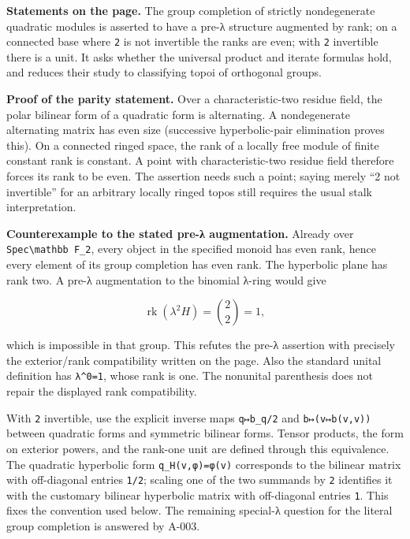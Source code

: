 \documentclass[
  10pt,
]{article}
\begin{document}
\textbf{Statements on the page.} The group completion of strictly
nondegenerate quadratic modules is asserted to have a pre-λ structure
augmented by rank; on a connected base where \texttt{\small 2} is not
invertible the ranks are even; with \texttt{\small 2} invertible there
is a unit. It asks whether the universal product and iterate formulas
hold, and reduces their study to classifying topoi of orthogonal groups.

\textbf{Proof of the parity statement.} Over a characteristic-two
residue field, the polar bilinear form of a quadratic form is
alternating. A nondegenerate alternating matrix has even size
(successive hyperbolic-pair elimination proves this). On a connected
ringed space, the rank of a locally free module of finite constant rank
is constant. A point with characteristic-two residue field therefore
forces its rank to be even. The assertion needs such a point; saying
merely ``2 not invertible'' for an arbitrary locally ringed topos still
requires the usual stalk interpretation.

\textbf{Counterexample to the stated pre-λ augmentation.} Already over
\texttt{\small Spec\textbackslash{}mathbb F\_\allowbreak{}2}, every
object in the specified monoid has even rank, hence every element of its
group completion has even rank. The hyperbolic plane has rank two. A
pre-λ augmentation to the binomial λ-ring would give

\[
\operatorname{rk}(\lambda^2H)=\binom22=1,
\]

which is impossible in that group. This refutes the pre-λ assertion with
precisely the exterior/rank compatibility written on the page. Also the
standard unital definition has
\texttt{\small λ\textasciicircum{}0=\allowbreak{}1}, whose rank is one.
The nonunital parenthesis does not repair the displayed rank
compatibility.

With \texttt{\small 2} invertible, use the explicit inverse maps
\texttt{\small q↦b\_\allowbreak{}q/\allowbreak{}2} and
\texttt{\small b↦(\allowbreak{}v↦b(\allowbreak{}v,\allowbreak{}v)\allowbreak{})\allowbreak{}}
between quadratic forms and symmetric bilinear forms. Tensor products,
the form on exterior powers, and the rank-one unit are defined through
this equivalence. The quadratic hyperbolic form
\texttt{\small q\_\allowbreak{}H(\allowbreak{}v,\allowbreak{}φ)\allowbreak{}=\allowbreak{}φ(\allowbreak{}v)\allowbreak{}}
corresponds to the bilinear matrix with off-diagonal entries
\texttt{\small 1/\allowbreak{}2}; scaling one of the two summands by
\texttt{\small 2} identifies it with the customary bilinear hyperbolic
matrix with off-diagonal entries \texttt{\small 1}. This fixes the
convention used below. The remaining special-λ question for the literal
group completion is answered by A-003.
\end{document}
